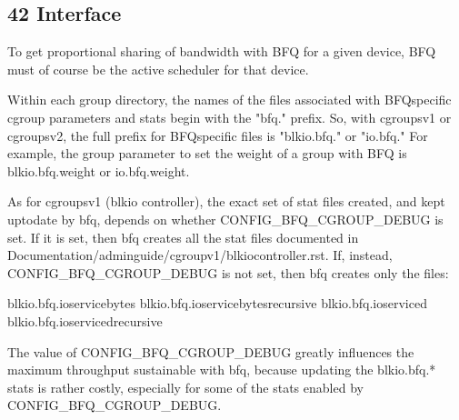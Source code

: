 \documentclass[a4paper,11pt,english]{sphinxmanual}
\begin{document}
\subsection{4\sphinxhyphen{}2 Interface}
\label{\detokenize{bfq-iosched:interface}}
To get proportional sharing of bandwidth with BFQ for a given device,
BFQ must of course be the active scheduler for that device.

Within each group directory, the names of the files associated with
BFQ\sphinxhyphen{}specific cgroup parameters and stats begin with the "bfq."
prefix. So, with cgroups\sphinxhyphen{}v1 or cgroups\sphinxhyphen{}v2, the full prefix for
BFQ\sphinxhyphen{}specific files is "blkio.bfq." or "io.bfq." For example, the group
parameter to set the weight of a group with BFQ is blkio.bfq.weight
or io.bfq.weight.

As for cgroups\sphinxhyphen{}v1 (blkio controller), the exact set of stat files
created, and kept up\sphinxhyphen{}to\sphinxhyphen{}date by bfq, depends on whether
CONFIG\_BFQ\_CGROUP\_DEBUG is set. If it is set, then bfq creates all
the stat files documented in
Documentation/admin\sphinxhyphen{}guide/cgroup\sphinxhyphen{}v1/blkio\sphinxhyphen{}controller.rst. If, instead,
CONFIG\_BFQ\_CGROUP\_DEBUG is not set, then bfq creates only the files:

\begin{sphinxVerbatim}[commandchars=\\\{\}]
blkio.bfq.io\PYGZus{}service\PYGZus{}bytes
blkio.bfq.io\PYGZus{}service\PYGZus{}bytes\PYGZus{}recursive
blkio.bfq.io\PYGZus{}serviced
blkio.bfq.io\PYGZus{}serviced\PYGZus{}recursive
\end{sphinxVerbatim}

The value of CONFIG\_BFQ\_CGROUP\_DEBUG greatly influences the maximum
throughput sustainable with bfq, because updating the blkio.bfq.*
stats is rather costly, especially for some of the stats enabled by
CONFIG\_BFQ\_CGROUP\_DEBUG.
\end{document}
